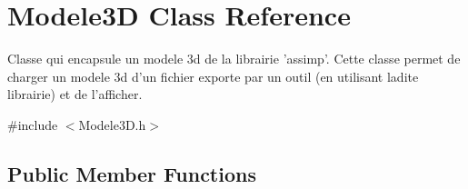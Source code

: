 \hypertarget{class_modele3_d}{\section{Modele3\-D Class Reference}
\label{class_modele3_d}
}


Classe qui encapsule un modele 3d de la librairie 'assimp'. Cette classe permet de charger un modele 3d d'un fichier exporte par un outil (en utilisant ladite librairie) et de l'afficher.  




{\ttfamily \#include $<$Modele3\-D.\-h$>$}

\subsection*{Public Member Functions}
